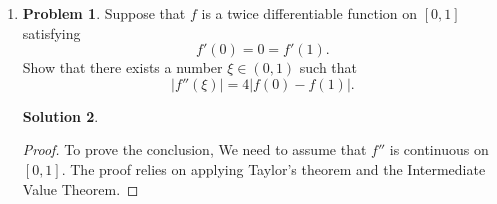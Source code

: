\documentclass[12pt]{article}
\theoremstyle{definition}
\newtheorem*{solution}{\normalfont\textbf{Solution}}
\newtheorem*{Problem}{\noindent\textbf{Problem}}
\begin{document}
\begin{enumerate}[leftmargin=*]
\begin{solution}
\begin{proof}
            Assume that \( f \) has a unique fixed point, denoted \( \xi \). Since \( [0,1] \) is compact, the sequence \( \{x_k\} \) has a convergent subsequence \( \{x_{k_j}\} \) with limit \( z \in [0,1] \). By continuity of \( f \),
            \[
            \lim_{j \to \infty} (x_{k_j} - x_{k_j + 1}) = \lim_{j \to \infty} (x_{k_j} - f(x_{k_j})) = z - f(z).
            \]
            Given that \( \lim_{k \to \infty} (x_k - x_{k+1}) = 0 \), it follows that \( z - f(z) = 0 \), so \( z \) is a fixed point of \( f \). Since \( \xi \) is the unique fixed point, \( z = \xi \). Thus, every convergent subsequence of \( \{x_k\} \) converges to \( \xi \). As \( [0,1] \) is compact, this implies that \( \{x_k\} \) converges to \( \xi \).
        \end{proof}
    \end{solution}

    \item \begin{Problem}
            Suppose that \( f \) is a twice differentiable function on \( [0, 1] \) satisfying
            \[
            f'(0) = 0 = f'(1).
            \]
            Show that there exists a number \( \xi \in (0, 1) \) such that
            \[
            |f''(\xi)| = 4|f(0) - f(1)|.
            \]
        \end{Problem}
        \begin{solution}
        \begin{proof}
             To prove the conclusion, We need to assume that \( f'' \) is continuous on \( [0, 1] \).
            The proof relies on applying Taylor's theorem and the Intermediate Value Theorem. 


\end{proof}
\end{solution}
\end{enumerate}
\end{document}
